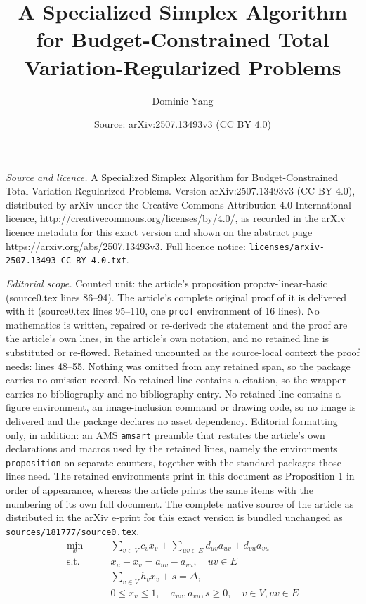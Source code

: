 \documentclass[10pt,a4paper]{amsart}
\title{A Specialized Simplex Algorithm for Budget-Constrained Total Variation-Regularized Problems}
\author{Dominic Yang}
\date{Source: arXiv:2507.13493v3 (CC BY 4.0)}
\begin{document}
\maketitle

\noindent\emph{Source and licence.} A Specialized Simplex Algorithm for Budget-Constrained Total Variation-Regularized Problems. Version arXiv:2507.13493v3 (CC BY 4.0), distributed by arXiv under the Creative Commons Attribution 4.0 International licence, http://creativecommons.org/licenses/by/4.0/, as recorded in the arXiv licence metadata for this exact version and shown on the abstract page https://arxiv.org/abs/2507.13493v3. Full licence notice: \texttt{licenses/arxiv-2507.13493-CC-BY-4.0.txt}.\par\smallskip

\noindent\textit{Editorial scope.} Counted unit: the article's proposition prop:tv-linear-basic (source0.tex lines 86--94). The article's complete original proof of it is delivered with it (source0.tex lines 95--110, one \texttt{proof} environment of 16 lines). No mathematics is written, repaired or re-derived: the statement and the proof are the article's own lines, in the article's own notation, and no retained line is substituted or re-flowed.  Retained uncounted as the source-local context the proof needs: lines 48--55.  Nothing was omitted from any retained span, so the package carries no omission record.  No retained line contains a citation, so the wrapper carries no bibliography and no bibliography entry.  No retained line contains a figure environment, an image-inclusion command or drawing code, so no image is delivered and the package declares no asset dependency.  Editorial formatting only, in addition: an AMS \texttt{amsart} preamble that restates the article's own declarations and macros used by the retained lines, namely the environments \texttt{proposition} on separate counters, together with the standard packages those lines need.  The retained environments print in this document as Proposition 1 in order of appearance, whereas the article prints the same items with the numbering of its own full document.  The complete native source of the article as distributed in the arXiv e-print for this exact version is bundled unchanged as \texttt{sources/181777/source0.tex}.
\begin{equation}\label{eq:TV-Linear}
\begin{aligned}
    \min_{x} \qquad &\sum_{v \in V} c_v x_v + \sum_{uv \in E}d_{uv}a_{uv} + d_{vu} a_{vu} \\
    \text{s.t.} \qquad & x_u - x_v = a_{uv} - a_{vu},  \quad uv \in E\\
                        &\sum_{v\in V}h_v x_v + s = \Delta,\\
                        & 0 \le x_v \le 1,\quad  a_{uv}, a_{vu}, s \ge 0, \quad v \in V, uv \in E
\end{aligned}
\end{equation}
\end{document}
